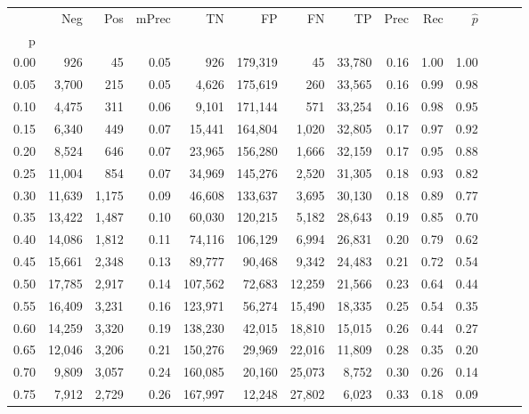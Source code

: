 \begin{tabular}{rrrrrrrrrrrrrr}
\toprule
{} &     Neg &    Pos & mPrec &       TN &       FP &      FN &      TP &  Prec &   Rec & $\hat{p}$ \\
p    &         &        &       &          &          &         &         &       &       &           \\
\midrule
0.00 &     926 &     45 &  0.05 &      926 &  179,319 &      45 &  33,780 &  0.16 &  1.00 &      1.00 \\
0.05 &   3,700 &    215 &  0.05 &    4,626 &  175,619 &     260 &  33,565 &  0.16 &  0.99 &      0.98 \\
0.10 &   4,475 &    311 &  0.06 &    9,101 &  171,144 &     571 &  33,254 &  0.16 &  0.98 &      0.95 \\
0.15 &   6,340 &    449 &  0.07 &   15,441 &  164,804 &   1,020 &  32,805 &  0.17 &  0.97 &      0.92 \\
0.20 &   8,524 &    646 &  0.07 &   23,965 &  156,280 &   1,666 &  32,159 &  0.17 &  0.95 &      0.88 \\
0.25 &  11,004 &    854 &  0.07 &   34,969 &  145,276 &   2,520 &  31,305 &  0.18 &  0.93 &      0.82 \\
0.30 &  11,639 &  1,175 &  0.09 &   46,608 &  133,637 &   3,695 &  30,130 &  0.18 &  0.89 &      0.77 \\
0.35 &  13,422 &  1,487 &  0.10 &   60,030 &  120,215 &   5,182 &  28,643 &  0.19 &  0.85 &      0.70 \\
0.40 &  14,086 &  1,812 &  0.11 &   74,116 &  106,129 &   6,994 &  26,831 &  0.20 &  0.79 &      0.62 \\
0.45 &  15,661 &  2,348 &  0.13 &   89,777 &   90,468 &   9,342 &  24,483 &  0.21 &  0.72 &      0.54 \\
0.50 &  17,785 &  2,917 &  0.14 &  107,562 &   72,683 &  12,259 &  21,566 &  0.23 &  0.64 &      0.44 \\
0.55 &  16,409 &  3,231 &  0.16 &  123,971 &   56,274 &  15,490 &  18,335 &  0.25 &  0.54 &      0.35 \\
0.60 &  14,259 &  3,320 &  0.19 &  138,230 &   42,015 &  18,810 &  15,015 &  0.26 &  0.44 &      0.27 \\
0.65 &  12,046 &  3,206 &  0.21 &  150,276 &   29,969 &  22,016 &  11,809 &  0.28 &  0.35 &      0.20 \\
0.70 &   9,809 &  3,057 &  0.24 &  160,085 &   20,160 &  25,073 &   8,752 &  0.30 &  0.26 &      0.14 \\
0.75 &   7,912 &  2,729 &  0.26 &  167,997 &   12,248 &  27,802 &   6,023 &  0.33 &  0.18 &      0.09 \\

\end{tabular}
